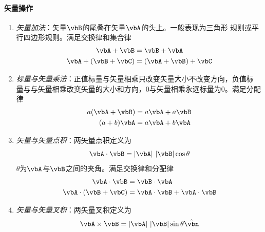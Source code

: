 \paragraph*{矢量操作}
\begin{enumerate}
    \item \textit{矢量加法}：矢量$\vbB$的尾叠在矢量$\vbA$的头上。一般表现为三角形
          规则或平行四边形规则。满足交换律和集合律
          \begin{align}
              \vbA + \vbB &= \vbB + \vbA
                                          \label{eq:vec-vec-add-exchang} \\
              \vbA + (\vbB + \vbC) &= (\vbA + \vbB) + \vbC
                                          \label{eq:vec-vec-add-combine}
          \end{align}
    \item \textit{标量与矢量乘法}：正值标量与矢量相乘只改变矢量大小不改变方向，负值标
          量与与矢量相乘改变矢量的大小和方向，$0$与矢量相乘永远标量为0。满足分配律
          \begin{equation}
              \begin{aligned}
                  a(\vbA + \vbB) &= a\vbA + a\vbB \\
                  (a + b) \vbA     &= a\vbA + b\vbA
              \end{aligned}
            \label{eq:vec-distri}
          \end{equation}
    \item \textit{矢量与矢量点积}：两矢量点积定义为
           \begin{equation}
               \vbA \cdot \vbB = |\vbA|\ |\vbB|\cos{\theta}
            \label{eq:vec-dotproduct}
           \end{equation}
           $\theta$为$\vbA$与$\vbB$之间的夹角。满足交换律和分配律
           \begin{align}
               \vbA \cdot \vbB &= \vbB \cdot \vbA
                                           \label{eq:vec-vec-dot-exchange}   \\
               \vbA \cdot (\vbB + \vbC) &= \vbA \cdot \vbB + \vbA \cdot \vbB
                                           \label{eq:vec-vec-dot-distri}
           \end{align}
    \item \textit{矢量与矢量叉积}：两矢量叉积定义为
          \begin{equation}
              \vbA \times \vbB = |\vbA|\ |\vbB|\sin{\theta} \hat{\vbn}
            \label{eq:vec-vec-cross}
          \end{equation}

\end{enumerate}
